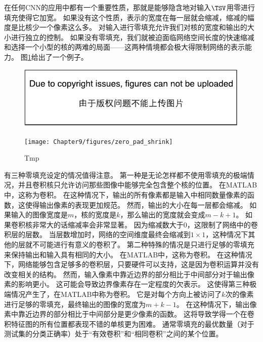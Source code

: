 在任何\gls{CNN}的应用中都有一个重要性质，那就是能够隐含地对输入$\TSV$用零进行填充使得它加宽。
如果没有这个性质，表示的宽度在每一层就会缩减，缩减的幅度是比核少一个像素这么多。
对输入进行零填充允许我们对核的宽度和输出的大小进行独立的控制。
如果没有零填充，我们就被迫面临网络空间长度的快速缩减和选择一个小型的核的两难的局面——这两种情境都会极大得限制网络的表示能力。
图\ref{fig:chap9_zero_pad_shrink}给出了一个例子。
\begin{figure}[!htb]
\ifOpenSource
\centerline{\includegraphics{figure.pdf}}
\else
\centerline{\texttt{[image: Chapter9/figures/zero\_pad\_shrink]}}
\fi
\caption{Tmp}
\label{fig:chap9_zero_pad_shrink}
\end{figure}

有三种零填充设定的情况值得注意。
第一种是无论怎样都不使用零填充的极端情况，并且卷积核只允许访问那些图像中能够完全包含整个核的位置。
在MATLAB中，这称为卷积。
在这种情况下，输出的所有像素都是输入中相同数量像素的函数，这使得输出像素的表现更加规范。
然而，输出的大小在每一层都会缩减。
如果输入的图像宽度是$m$，核的宽度是$k$，那么输出的宽度就会变成$m-k+1$。
如果卷积核非常大的话缩减率会非常显著。
因为缩减数大于0，这限制了网络中的卷积层的层数。
当层数增加时，网络的空间维度最终会缩减到$1\times 1$，这种情况下其他的层就不可能进行有意义的卷积了。
第二种特殊的情况是只进行足够的零填充来保持输出和输入具有相同的大小。
在MATLAB中，这称为卷积。
在这种情况下，网络能够包含足够多的卷积层，只要硬件可以支持，这是因为卷积运算并没有改变相关的结构。
然而，输入像素中靠近边界的部分相比于中间部分对于输出像素的影响更小。
这可能会导致边界像素存在一定程度的欠表示。
这使得第三种极端情况产生了，在MATLAB中称为卷积。
它是对每个方向上被访问了$k$次的像素进行足够的零填充，最终输出的图像的宽度为$m+k-1$。
在这种情况下，输出像素中靠近边界的部分相比于中间部分是更少像素的函数。
这将导致学得一个在卷积特征图的所有位置都表现不错的单核更为困难。
通常零填充的最优数量（对于测试集的分类正确率）处于``有效卷积''和``相同卷积''之间的某个位置。

 

